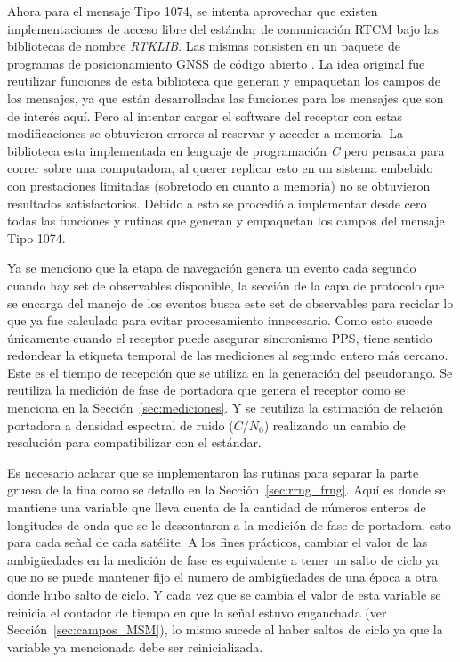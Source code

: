 \documentclass[a4paper,12pt,oneside,onecolumn,final,openright]{book}%
\begin{document}
	Ahora para el mensaje Tipo 1074, se intenta aprovechar que existen implementaciones de acceso libre del estándar de comunicación RTCM bajo las bibliotecas de nombre \textit{RTKLIB}. Las mismas consisten en un paquete de programas de posicionamiento GNSS de código abierto \cite{rtklib}. La idea original fue reutilizar funciones de esta biblioteca que generan y empaquetan los campos de los mensajes, ya que están desarrolladas las funciones para los mensajes que son de interés aquí. Pero al intentar cargar el software del receptor con estas modificaciones se obtuvieron errores al reservar y acceder a memoria. La biblioteca esta implementada en lenguaje de programación \textit{C} pero pensada para correr sobre una computadora, al querer replicar esto en un sistema embebido con prestaciones limitadas (sobretodo en cuanto a memoria) no se obtuvieron resultados satisfactorios. Debido a esto se procedió a implementar desde cero todas las funciones y rutinas que generan y empaquetan los campos del mensaje Tipo 1074.
	
	Ya se menciono que la etapa de navegación genera un evento cada segundo cuando hay set de observables disponible, la sección de la capa de protocolo que se encarga del manejo de los eventos busca este set de observables para reciclar lo que ya fue calculado para evitar procesamiento innecesario. Como esto sucede únicamente cuando el receptor puede asegurar sincronismo PPS, tiene sentido redondear la etiqueta temporal de las mediciones al segundo entero más cercano. Este es el tiempo de recepción que se utiliza en la generación del pseudorango. Se reutiliza la medición de fase de portadora que genera el receptor como se menciona en la Sección~\ref{sec:mediciones}. Y se reutiliza la estimación de relación portadora a densidad espectral de ruido ($C/N_0$) realizando un cambio de resolución para compatibilizar con el estándar.
	
	 Es necesario aclarar que se implementaron las rutinas para separar la parte gruesa de la fina como se detallo en la Sección~\ref{sec:rrng_frng}. Aquí es donde se mantiene una variable que lleva cuenta de la cantidad de números enteros de longitudes de onda que se le descontaron a la medición de fase de portadora, esto para cada señal de cada satélite. A los fines prácticos, cambiar el valor de las ambigüedades en la medición de fase es equivalente a tener un salto de ciclo ya que no se puede mantener fijo el numero de ambigüedades de una época a otra donde hubo salto de ciclo. Y cada vez que se cambia el valor de esta variable se reinicia el contador de tiempo en que la señal estuvo enganchada (ver Sección~\ref{sec:campos_MSM}), lo mismo sucede al haber saltos de ciclo ya que la variable ya mencionada debe ser reinicializada.
	
\end{document}
